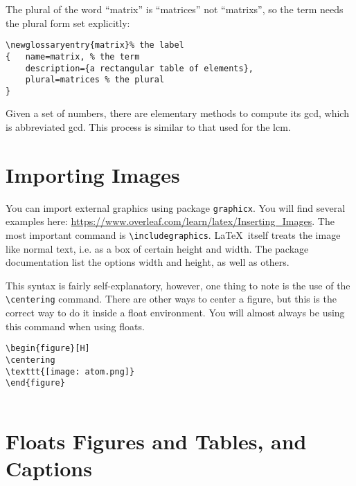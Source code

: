 The plural of the word ``\gls{matrix}'' is ``matrices'' not ``matrixs'', so the term needs the plural form set explicitly:

 \begin{verbatim}
\newglossaryentry{matrix}% the label
{	name=matrix, % the term
 	description={a rectangular table of elements}, 
	plural=matrices % the plural
}
 \end{verbatim}

Given a set of numbers, there are elementary methods to compute its \acrlong{gcd}, which is abbreviated \acrshort{gcd}. This process is similar to that used for the \acrfull{lcm}.

\section{Importing Images} %
\label{sec:importing_images}

You can import external graphics using package \verb|graphicx|. You will find several examples here: \url{https://www.overleaf.com/learn/latex/Inserting_Images}. The most important command is \verb|\includegraphics|. \LaTeX ~itself treats the image like normal text, i.e. as a box of certain height and width. The package documentation list the options width and height, as well as others.

This syntax is fairly self-explanatory, however, one thing to note is the use of the \verb|\centering| command. There are other ways to center a figure, but this is the correct way to do it inside a float environment. You will almost always be using this command when using floats.
\begin{verbatim}
\begin{figure}[H]
\centering
\texttt{[image: atom.png]}
\end{figure}
    
\end{verbatim}


\section{Floats Figures and Tables, and Captions} %
\label{sec:floats_figures_and_captions}

